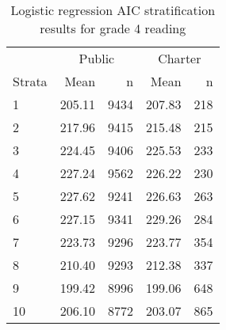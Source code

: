 \begin{table}[h!]
\centering
\caption{Logistic regression AIC stratification results for grade 4 reading} 
\label{g4read-circpsa10AIC}
\begin{tabular}{lrr@{\extracolsep{.2cm}}rr}
  \hline
   & \multicolumn{2}{c}{Public} & \multicolumn{2}{c}{Charter} \\ \cline{2-3} \cline{4-5} Strata & Mean & n & Mean & n \\ \hline
1 & 205.11 & 9434 & 207.83 & 218 \\ 
  2 & 217.96 & 9415 & 215.48 & 215 \\ 
  3 & 224.45 & 9406 & 225.53 & 233 \\ 
  4 & 227.24 & 9562 & 226.22 & 230 \\ 
  5 & 227.62 & 9241 & 226.63 & 263 \\ 
  6 & 227.15 & 9341 & 229.26 & 284 \\ 
  7 & 223.73 & 9296 & 223.77 & 354 \\ 
  8 & 210.40 & 9293 & 212.38 & 337 \\ 
  9 & 199.42 & 8996 & 199.06 & 648 \\ 
  10 & 206.10 & 8772 & 203.07 & 865 \\ 
   \hline
\end{tabular}
\end{table}
